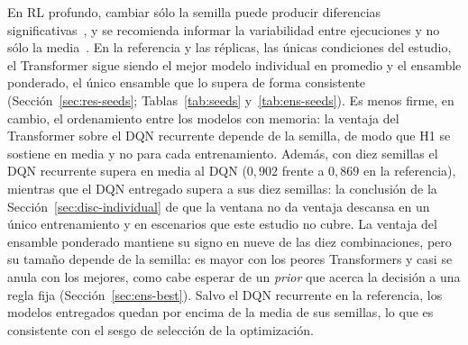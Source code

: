 \documentclass[../00_Main/Main.tex]{subfiles}
\begin{document}
En RL profundo, cambiar s\'olo la semilla puede producir diferencias
significativas~\citep{Henderson2018}, y se recomienda informar la
variabilidad entre ejecuciones y no s\'olo la media~\citep{Agarwal2021}.
En la referencia y las r\'eplicas, las \'unicas condiciones del estudio,
el Transformer sigue siendo el mejor modelo individual en promedio y el
ensamble ponderado, el \'unico ensamble que lo supera de forma
consistente (Secci\'on~\ref{sec:res-seeds}; Tablas~\ref{tab:seeds}
y~\ref{tab:ens-seeds}). Es menos firme, en cambio, el ordenamiento entre
los modelos con memoria: la ventaja del Transformer sobre el DQN
recurrente depende de la semilla, de modo que H1 se sostiene en media y
no para cada entrenamiento. Adem\'as, con diez semillas el DQN recurrente
supera en media al DQN ($0{,}902$ frente a $0{,}869$ en la referencia),
mientras que el DQN entregado supera a sus diez semillas: la conclusi\'on
de la Secci\'on~\ref{sec:disc-individual} de que la ventana no da
ventaja descansa en un \'unico entrenamiento y en escenarios que este
estudio no cubre. La ventaja del ensamble ponderado mantiene su signo en
nueve de las diez combinaciones, pero su tama\~no depende de la semilla:
es mayor con los peores Transformers y casi se anula con los mejores,
como cabe esperar de un \emph{prior} que acerca la decisi\'on a una regla
fija (Secci\'on~\ref{sec:ens-best}). Salvo el DQN recurrente en la
referencia, los modelos entregados quedan por encima de la media de sus
semillas, lo que es consistente con el sesgo de selecci\'on de la
optimizaci\'on.

\biblio
\end{document}
